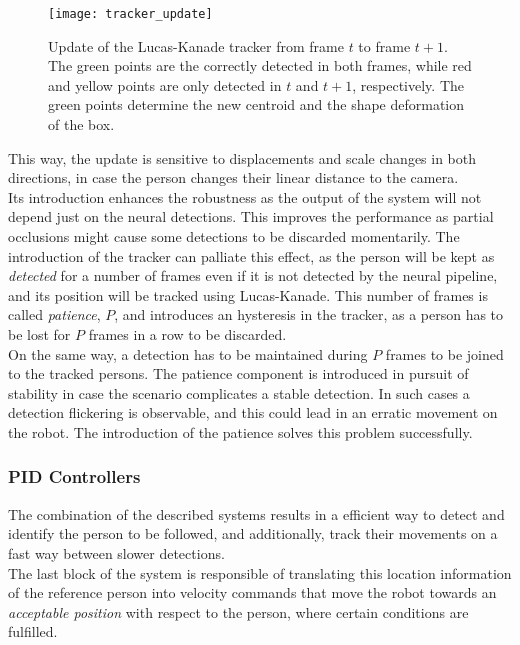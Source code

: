 \begin{figure}[h]
	\centering
	\texttt{[image: tracker\_update]}
	\caption{Update of the Lucas-Kanade tracker from frame $t$ to frame $t+1$. The green points are the correctly detected in both frames, while red and yellow points are only detected in $t$ and $t+1$, respectively. The green points determine the new centroid and the shape deformation of the box.}
	\label{fig:2_tracker_update}
\end{figure}

This way, the update is sensitive to displacements and scale changes in both directions, in case the person changes their linear distance to the camera.\\



Its introduction enhances the robustness as the output of the system will not depend just on the neural detections. This improves the performance as partial occlusions might cause some detections to be discarded momentarily. The introduction of the tracker can palliate this effect, as the person will be kept as \textit{detected} for a number of frames even if it is not detected by the neural pipeline, and its position will be tracked using Lucas-Kanade. This number of frames is called \textit{patience}, $P$, and introduces an hysteresis in the tracker, as a person has to be lost for $P$ frames in a row to be discarded.\\



On the same way, a detection has to be maintained during $P$ frames to be joined to the tracked persons. The patience component is introduced in pursuit of stability in case the scenario complicates a stable detection. In such cases a detection flickering is observable, and this could lead in an erratic movement on the robot. The introduction of the patience solves this problem successfully.


\subsubsection{PID Controllers}
The combination of the described systems results in a efficient way to detect and identify the person to be followed, and additionally, track their movements on a fast way between slower detections.\\

The last block of the system is responsible of  translating this location information of the reference person into velocity commands that move the robot towards an \textit{acceptable position} with respect to the person, where certain conditions are fulfilled.\\

